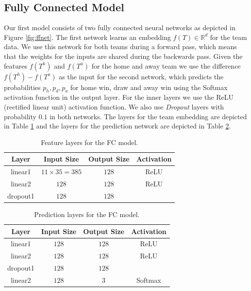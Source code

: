 \documentclass[a4paper]{article}
\begin{document}
\subsection{Fully Connected Model}
Our first model consists of two fully connected neural networks as depicted in Figure \ref{fig:ffnet}. The first network learns an embedding $f(T) \in \mathbb{R}^d $ for the team data. We use this network for both teams during a forward pass, which means that the weights for the inputs are shared during the backwards pass. Given the features $f(T^h)$ and $f(T^a)$ for the home and away team we use the difference $f(T^h)-f(T^a)$ as the input for the second network, which predicts the probabilities $p_h, p_d, p_a$ for home win, draw and away win using the Softmax activation function in the output layer. For the inner layers we use the ReLU (rectified linear unit) activation function. We also use \textit{Dropout} \cite{Dropout14} layers with probability $0.1$ in both networks. The layers for the team embedding are depicted in Table \ref{tab:flayer} and the layers for the prediction network are depicted in Table \ref{tab:player}. 
 
\begin{table}
\begin{tabular}{|c|c|c|c|}
\hline 
\textbf{Layer} & \textbf{Input Size} & \textbf{Output Size} & \textbf{Activation} \\ 
\hline 	
\hline
linear1 & $11 \times 35=385$ & $128$ & ReLU \\ 
\hline 
linear2 & $128$ & $128$ & ReLU \\ 
\hline 
dropout1 & $128$ & $128$ &  \\ 
\hline 
\end{tabular} 
\caption{Feature layers for the FC model.}
\label{tab:flayer}
\end{table}

\begin{table}
\begin{tabular}{|c|c|c|c|}
\hline 
\textbf{Layer} & \textbf{Input Size} & \textbf{Output Size} & \textbf{Activation} \\ 
\hline 	
\hline
linear1 & $128$ & $128$ & ReLU \\ 
\hline 
linear2 & $128$ & $128$ & ReLU \\ 
\hline 
dropout1 & $128$ & $128$ &  \\ 
\hline 
linear2 & $128$ & $3$ & Softmax \\ 
\hline
\end{tabular} 
\caption{Prediction layers for the FC model.}
\label{tab:player}
\end{table}
\end{document}
